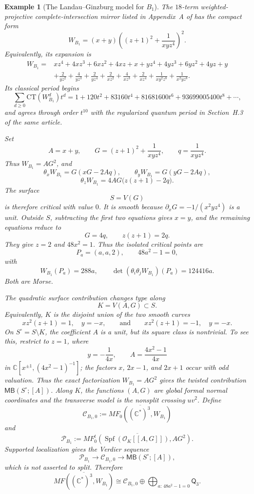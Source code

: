 \documentclass[11pt]{amsart}
\newtheorem{example}{Example}[section]
\newcommand{\MorseCat}[1]{\mathsf{Q}_{#1}}
\newcommand{\MBtwcat}[2]{\mathsf{MB}(#1;[#2])}
\begin{document}
\begin{example}[The Landau--Ginzburg model for $B_1$]
The $18$-term weighted-projective complete-intersection mirror listed in
Appendix~A of \cite{CoatesCortiGalkinKasprzyk2016} has the compact form
\[
W_{B_1}
=(x+y)\left((z+1)^2+\frac{1}{xyz^4}\right)^2.
\]
Equivalently, its expansion is
\[
\begin{aligned}
W_{B_1}={}&xz^4+4xz^3+6xz^2+4xz+x
 +yz^4+4yz^3+6yz^2+4yz+y\\
&+\frac{2}{yz^2}+\frac{4}{yz^3}+\frac{2}{yz^4}
 +\frac{2}{xz^2}+\frac{4}{xz^3}+\frac{2}{xz^4}
 +\frac{1}{xy^2z^8}+\frac{1}{x^2yz^8}.
\end{aligned}
\]
Its classical period begins
\[
\sum_{d\geq0}\mathrm{CT}(W_{B_1}^d)t^d
=1+120t^2+83160t^4+81681600t^6+93699005400t^8+\cdots,
\]
and agrees through order $t^{10}$ with the regularized quantum period in
Section~H.3 of the same article.

Set
\[
A=x+y,
\qquad
G=(z+1)^2+\frac{1}{xyz^4},
\qquad
q=\frac{1}{xyz^4}.
\]
Thus $W_{B_1}=AG^2$, and
\[
\theta_xW_{B_1}=G(xG-2Aq),
\qquad
\theta_yW_{B_1}=G(yG-2Aq),
\]
\[
\theta_zW_{B_1}=4AG\bigl(z(z+1)-2q\bigr).
\]
The surface
\[
S=V(G)
\]
is therefore critical with value $0$.  It is smooth because
$\partial_xG=-1/(x^2yz^4)$ is a unit.  Outside $S$, subtracting the first two
equations gives $x=y$, and the remaining equations reduce to
\[
G=4q,
\qquad
z(z+1)=2q.
\]
They give $z=2$ and $48x^2=1$.  Thus the isolated critical points are
\[
P_a=(a,a,2),
\qquad
48a^2-1=0,
\]
with
\[
W_{B_1}(P_a)=288a,
\qquad
\det(\theta_i\theta_jW_{B_1})(P_a)=124416a.
\]
Both are Morse.

The quadratic surface contribution changes type along
\[
K=V(A,G)\subset S.
\]
Equivalently, $K$ is the disjoint union of the two smooth curves
\[
xz^2(z+1)=1,\quad y=-x,
\qquad\text{and}\qquad
xz^2(z+1)=-1,\quad y=-x.
\]
On $S^\circ=S\setminus K$, the coefficient $A$ is a unit, but its square class
is nontrivial. To see this, restrict to $z=1$, where
\[
y=-\frac1{4x},
\qquad
A=\frac{4x^2-1}{4x}
\]
in $\mathbb C[x^{\pm1},(4x^2-1)^{-1}]$; the factors $x$, $2x-1$, and
$2x+1$ occur with odd valuation. Thus the exact factorization $W_{B_1}=AG^2$
gives the twisted contribution $\MBtwcat{S^\circ}{A}$. Along $K$, the
functions $(A,G)$ are global formal normal coordinates and the transverse
model is the nonsplit crossing $uv^2$.
Define
\[
\mathcal C_{B_1,0}:=
\overline{MF_0((\mathbb C^*)^3,W_{B_1})}
\]
and
\[
\mathcal P_{B_1}:=
\overline{MF^t_0\!\left(
\operatorname{Spf}(\mathcal O_K[[A,G]]),AG^2
\right)}.
\]
Supported localization gives the Verdier sequence
\[
\mathcal P_{B_1}\longrightarrow
\mathcal C_{B_1,0}\longrightarrow
\MBtwcat{S^\circ}{A},
\]
which is not asserted to split.  Therefore
\[
\overline{MF((\mathbb C^*)^3,W_{B_1})}
\cong
\mathcal C_{B_1,0}
\oplus
\bigoplus_{a:\,48a^2-1=0}\MorseCat{3}.
\]
\end{example}
\end{document}
